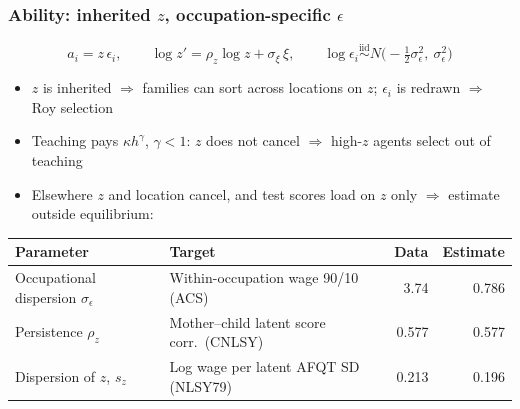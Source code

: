 \documentclass[11pt,hyperref={bookmarks=false},aspectratio=169]{beamer}
\begin{document}
\begin{frame}
\frametitle{Ability: inherited $z$, occupation-specific $\epsilon$}
\[
a_i = z\,\epsilon_i, \qquad
\log z' = \rho_z\log z + \sigma_\xi\,\xi, \qquad
\log\epsilon_i \overset{\text{iid}}{\sim} N\!\big(-\tfrac{1}{2}\sigma_\epsilon^2,\ \sigma_\epsilon^2\big)
\]
\begin{itemize}
  \item $z$ is inherited $\Rightarrow$ families can sort across locations on $z$;
        $\epsilon_i$ is redrawn $\Rightarrow$ Roy selection
  \item Teaching pays $\kappa h^{\gamma}$, $\gamma<1$: $z$ does not cancel
        $\Rightarrow$ high-$z$ agents select out of teaching
  \item Elsewhere $z$ and location cancel, and test scores load on $z$ only
        $\Rightarrow$ estimate outside equilibrium:
\end{itemize}
\medskip
\centering
\footnotesize
\renewcommand{\arraystretch}{1.15}
\begin{tabular}{@{}llrr@{}}
\toprule
Parameter & Target & Data & Estimate \\
\midrule
Occupational dispersion $\sigma_\epsilon$ & Within-occupation wage 90/10 (ACS) & 3.74 & 0.786 \\
Persistence $\rho_z$ & Mother--child latent score corr.\ (CNLSY) & 0.577 & 0.577 \\
Dispersion of $z$, $s_z$ & Log wage per latent AFQT SD (NLSY79) & 0.213 & 0.196 \\
\bottomrule
\end{tabular}
\end{frame}
\end{document}
